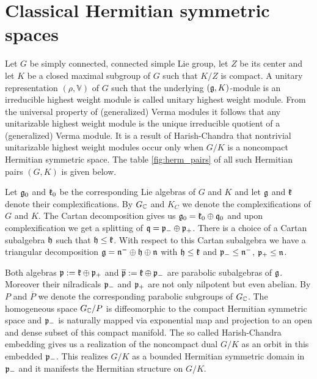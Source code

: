 \section{Classical Hermitian symmetric spaces}


Let $G$ be simply connected, connected simple Lie group, let $Z$ be its center and let $K$ be a closed  maximal subgroup of $G$ such that $K/Z$ is compact. A unitary representation $(\rho,\mathbb{V})$  of $G$ such that the underlying $(\mathfrak{g},K)$-module is an irreducible highest weight module is called unitary highest weight module. From the universal property of (generalized) Verma modules it follows that any unitarizable highest weight module is the unique irreducible quotient of a (generalized) Verma module. It is a result of Harish-Chandra that nontrivial unitarizable highest weight modules occur only when $G/K$ is a noncompact Hermitian symmetric space. The table \ref{fig:herm_pairs} of all such Hermitian pairs $(G,K)$ is given below.

Let $\mathfrak{g}_0$ and $\mathfrak{k}_0$ be the corresponding Lie algebras of $G$ and $K$ and let $\mathfrak{g}$ and $\mathfrak{k}$ denote their complexifications. By $G_{\mathbb{C}}$ and $K_C$ we denote the complexifications of $G$ and $K$. The Cartan decomposition gives us $\mathfrak{g}_0 = \mathfrak{k}_0 \oplus \mathfrak{q}_0$ and upon complexification we get a splitting of  $\mathfrak{q} = \mathfrak{p}_-\oplus\mathfrak{p}_+$. %
There is a choice of a Cartan subalgebra $\mathfrak{h}$ such that $\mathfrak{h} \leq \mathfrak{k}$. With respect to this Cartan subalgebra we have a triangular decomposition $\mathfrak{g}=\mathfrak{n}^-\oplus\mathfrak{h}\oplus\mathfrak{n}$ with $\mathfrak{h} \leq \mathfrak{k}$ and $\mathfrak{p}_-\leq \mathfrak{n}^-$, $\mathfrak{p}_+ \leq \mathfrak{n}$.

Both algebras $\mathfrak{p} := \mathfrak{k}\oplus \mathfrak{p}_+$ and $\overline{\mathfrak{p}} := \mathfrak{k}\oplus\mathfrak{p}_-$ are parabolic subalgebras of $\mathfrak{g}$. Moreover their nilradicals $\mathfrak{p}_-$ and $\mathfrak{p}_+$ are not only nilpotent but even abelian. By $P$ and $\overline{P}$ we denote the corresponding parabolic subgroups of $G_{\mathbb{C}}$. The homogeneous space $G_{\mathbb{C}}/P$ is diffeomorphic to the compact Hermitian symmetric space and $\mathfrak{p}_-$ is naturally mapped via exponential map and projection to an open and dense subset of this compact manifold. The so called Harish-Chandra embedding gives us a realization of the noncompact dual $G/K$ as an orbit in this embedded $\mathfrak{p}_-$. This realizes $G/K$ as a bounded Hermitian symmetric domain in $\mathfrak{p}_-$ and it manifests the Hermitian structure on $G/K$.

